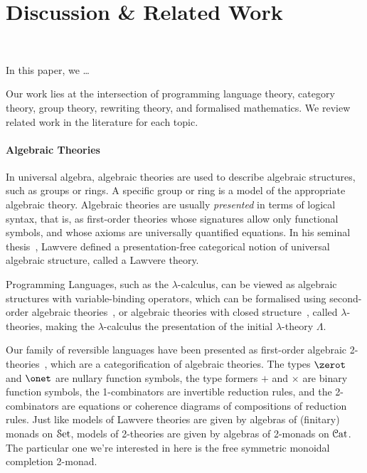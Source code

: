 \section{Discussion \& Related Work}~\label{sec:discussion}

In this paper, we \ldots

Our work lies at the intersection of programming language theory, category theory, group theory, rewriting theory, and
formalised mathematics. We review related work in the literature for each topic.

\paragraph{Algebraic Theories} In universal algebra, algebraic theories are used to describe algebraic structures, such
as groups or rings. A specific group or ring is a model of the appropriate algebraic theory. Algebraic theories are
usually \emph{presented} in terms of logical syntax, that is, as first-order theories whose signatures allow only
functional symbols, and whose axioms are universally quantified equations. In his seminal
thesis~\cite{lawvereFUNCTORIALSEMANTICSALGEBRAIC1963}, Lawvere defined a presentation-free categorical notion of
universal algebraic structure, called a Lawvere theory.

Programming Languages, such as the $\lambda$-calculus, can be viewed as algebraic structures with variable-binding
operators, which can be formalised using second-order algebraic theories~\cite{fioreSecondOrderAlgebraicTheories2010},
or algebraic theories with closed structure~\cite{hylandClassicalLambdaCalculus2017}, called $\lambda$-theories, making
the $\lambda$-calculus the presentation of the initial $\lambda$-theory $\Lambda$.

Our family of reversible languages have been presented as first-order algebraic
2-theories~\cite{cohenCoherenceRewriting2theories2009,bekeCategorificationTermRewriting2011,yanofskySyntaxCoherence2000},
which are a categorification of algebraic theories. The types $\zerot$ and $\onet$ are nullary function symbols, the
type formers $+$ and $\times$ are binary function symbols, the 1-combinators are invertible reduction rules, and the
2-combinators are equations or coherence diagrams of compositions of reduction rules. Just like models of Lawvere
theories are given by algebras of (finitary) monads on $\SetCat$, models of 2-theories are given by algebras of 2-monads
on $\CatCat$. The particular one we're interested in here is the free symmetric monoidal completion 2-monad.

